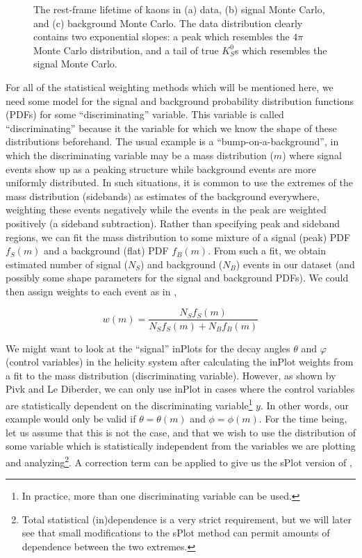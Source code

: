 \begin{figure}
\begin{center}
\begin{subfigure}[b]{.7\columnwidth}
      \caption{}
      \label{fig:rfl-bkgmc}
    \end{subfigure}
  \end{center}
  \caption{The rest-frame lifetime of kaons in (a) data, (b) signal Monte Carlo, and (c) background Monte Carlo. The data distribution clearly contains two exponential slopes: a peak which resembles the $4\pi$ Monte Carlo distribution, and a tail of true $K_S^0$s which resembles the signal Monte Carlo.}\label{fig:rfl-pre-splot}
\end{figure}

For all of the statistical weighting methods which will be mentioned here, we need some model for the signal and background probability distribution functions (PDFs) for some ``discriminating'' variable. This variable is called ``discriminating'' because it the variable for which we know the shape of these distributions beforehand. The usual example is a ``bump-on-a-background'', in which the discriminating variable may be a mass distribution ($m$) where signal events show up as a peaking structure while background events are more uniformly distributed. In such situations, it is common to use the extremes of the mass distribution (sidebands) as estimates of the background everywhere, weighting these events negatively while the events in the peak are weighted positively (a sideband subtraction). Rather than specifying peak and sideband regions, we can fit the mass distribution to some mixture of a signal (peak) PDF $f_S(m)$ and a background (flat) PDF $f_B(m)$. From such a fit, we obtain estimated number of signal ($N_S$) and background ($N_B$) events in our dataset (and possibly some shape parameters for the signal and background PDFs). We could then assign weights to each event as in ,

\begin{equation}
  w(m) = \frac{N_S f_S(m)}{N_S f_S(m) + N_B f_B(m)}
  \label{eq:inplot-weights-mass}
\end{equation}

We might want to look at the ``signal'' inPlots for the decay angles $\theta$ and $\varphi$ (control variables) in the helicity system after calculating the inPlot weights from a fit to the mass distribution (discriminating variable). However, as shown by Pivk and Le Diberder\cite{pivk_splot_2005}, we can only use inPlot in cases where the control variables are statistically dependent on the discriminating variable\footnote{In practice, more than one discriminating variable can be used.} $y$. In other words, our example would only be valid if $\theta = \theta(m)$ and $\phi = \phi(m)$. For the time being, let us assume that this is not the case, and that we wish to use the distribution of some variable which is statistically independent from the variables we are plotting and analyzing\footnote{Total statistical (in)dependence is a very strict requirement, but we will later see that small modifications to the sPlot method can permit amounts of dependence between the two extremes.}. A correction term can be applied to give us the sPlot version of ,

